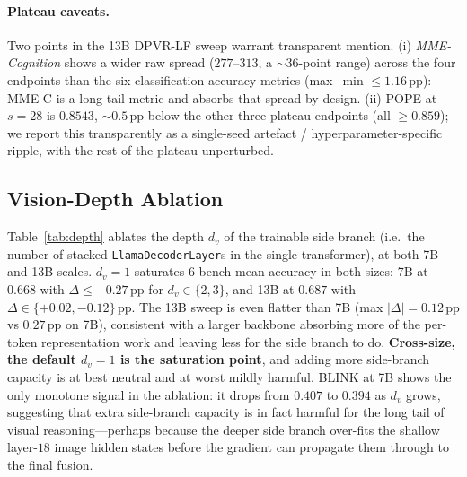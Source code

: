 \documentclass[a4paper,fleqn,review]{cas-sc}
\newcommand{\dpvrlf}{DPVR-LF}
\begin{document}
\paragraph{Plateau caveats.} Two points in the 13B \dpvrlf{} sweep
warrant transparent mention. (i) \emph{MME-Cognition} shows a wider
raw spread ($277$--$313$, a ${\sim}36$-point range) across the four
endpoints than the six classification-accuracy metrics
(max$-$min $\leq 1.16$\,pp): MME-C is a long-tail metric and absorbs
that spread by design. (ii) POPE at $s = 28$ is $0.8543$,
$\sim 0.5$\,pp below the other three plateau endpoints
(all $\geq 0.859$); we report this transparently as a single-seed
artefact / hyperparameter-specific ripple, with the rest of the
plateau unperturbed.

\subsection{Vision-Depth Ablation}\label{sec:exp-depth}

Table~\ref{tab:depth} ablates the depth $d_v$ of the trainable side
branch (i.e.\ the number of stacked \texttt{LlamaDecoderLayer}s in
the single transformer), at both 7B and 13B scales. $d_v = 1$
saturates 6-bench mean accuracy in both sizes: 7B at $0.668$ with
$\Delta \leq -0.27$\,pp for $d_v \in \{2, 3\}$, and 13B at $0.687$
with $\Delta \in \{+0.02, -0.12\}$\,pp. The 13B sweep is even
flatter than 7B (max $|\Delta| = 0.12$\,pp vs $0.27$\,pp on 7B),
consistent with a larger backbone absorbing more of the per-token
representation work and leaving less for the side branch to do.
\textbf{Cross-size, the default $d_v = 1$ is the saturation point},
and adding more side-branch capacity is at best neutral and at
worst mildly harmful. BLINK at 7B shows the only monotone signal
in the ablation: it drops from $0.407$ to $0.394$ as $d_v$ grows,
suggesting that extra side-branch capacity is in fact harmful for
the long tail of visual reasoning---perhaps because the deeper side
branch over-fits the shallow layer-$18$ image hidden states before
the gradient can propagate them through to the final fusion.
\end{document}
